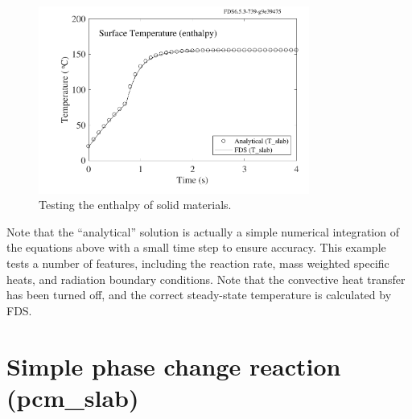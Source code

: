 \documentclass[11pt]{book}
\begin{document}
\begin{figure}[ht]
\begin{center}
\includegraphics[width=3.5in]{SCRIPT_FIGURES/enthalpy}
\end{center}
\caption[The {\bf enthalpy} test case.]{Testing the enthalpy of solid materials.}
\label{enthalpy}
\end{figure}

\noindent
Note that the ``analytical'' solution is actually a simple numerical integration of the equations above with a small time step to ensure accuracy.
This example tests a number of features, including the reaction rate, mass weighted specific heats, and radiation boundary conditions. Note that the
convective heat transfer has been turned off, and the correct steady-state temperature is calculated by FDS.

\clearpage


\section{Simple phase change reaction (\texorpdfstring{{\bf pcm\_slab}}{pcm\_slab})}
\end{document}

